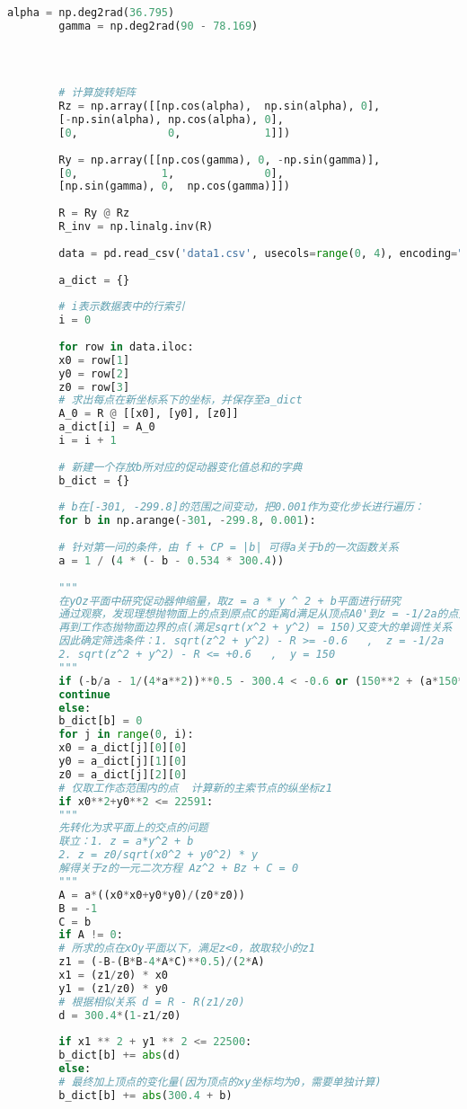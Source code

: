\documentclass{cumcmthesis}
\begin{document}
\begin{appendices}
\begin{lstlisting}[language={python}]
		alpha = np.deg2rad(36.795)
		gamma = np.deg2rad(90 - 78.169)
		
		
		
		
		# 计算旋转矩阵
		Rz = np.array([[np.cos(alpha),  np.sin(alpha), 0],
		[-np.sin(alpha), np.cos(alpha), 0],
		[0,              0,             1]])
		
		Ry = np.array([[np.cos(gamma), 0, -np.sin(gamma)],
		[0,             1,              0],
		[np.sin(gamma), 0,  np.cos(gamma)]])
		
		R = Ry @ Rz
		R_inv = np.linalg.inv(R)
		
		data = pd.read_csv('data1.csv', usecols=range(0, 4), encoding="gbk")
		
		a_dict = {}
		
		# i表示数据表中的行索引
		i = 0
		
		for row in data.iloc:
		x0 = row[1]
		y0 = row[2]
		z0 = row[3]
		# 求出每点在新坐标系下的坐标，并保存至a_dict
		A_0 = R @ [[x0], [y0], [z0]]
		a_dict[i] = A_0
		i = i + 1
		
		# 新建一个存放b所对应的促动器变化值总和的字典
		b_dict = {}
		
		# b在[-301, -299.8]的范围之间变动，把0.001作为变化步长进行遍历：
		for b in np.arange(-301, -299.8, 0.001):
		
		# 针对第一问的条件，由 f + CP = |b| 可得a关于b的一次函数关系
		a = 1 / (4 * (- b - 0.534 * 300.4))
		
		"""
		在yOz平面中研究促动器伸缩量，取z = a * y ^ 2 + b平面进行研究
		通过观察，发现理想抛物面上的点到原点C的距离d满足从顶点A0'到z = -1/2a的点先变小，
		再到工作态抛物面边界的点(满足sqrt(x^2 + y^2) = 150)又变大的单调性关系
		因此确定筛选条件：1. sqrt(z^2 + y^2) - R >= -0.6   ,  z = -1/2a
		2. sqrt(z^2 + y^2) - R <= +0.6   ,  y = 150
		"""
		if (-b/a - 1/(4*a**2))**0.5 - 300.4 < -0.6 or (150**2 + (a*150**2+b)**2)**0.5 - 300.4 > 0.6:
		continue
		else:
		b_dict[b] = 0
		for j in range(0, i):
		x0 = a_dict[j][0][0]
		y0 = a_dict[j][1][0]
		z0 = a_dict[j][2][0]
		# 仅取工作态范围内的点  计算新的主索节点的纵坐标z1
		if x0**2+y0**2 <= 22591:
		"""
		先转化为求平面上的交点的问题
		联立：1. z = a*y^2 + b
		2. z = z0/sqrt(x0^2 + y0^2) * y
		解得关于z的一元二次方程 Az^2 + Bz + C = 0
		"""
		A = a*((x0*x0+y0*y0)/(z0*z0))
		B = -1
		C = b
		if A != 0:
		# 所求的点在xOy平面以下，满足z<0，故取较小的z1
		z1 = (-B-(B*B-4*A*C)**0.5)/(2*A)
		x1 = (z1/z0) * x0
		y1 = (z1/z0) * y0
		# 根据相似关系 d = R - R(z1/z0)
		d = 300.4*(1-z1/z0)
		
		if x1 ** 2 + y1 ** 2 <= 22500:
		b_dict[b] += abs(d)
		else:
		# 最终加上顶点的变化量(因为顶点的xy坐标均为0，需要单独计算)
		b_dict[b] += abs(300.4 + b)
		

\end{lstlisting}
\end{appendices}
\end{document}

